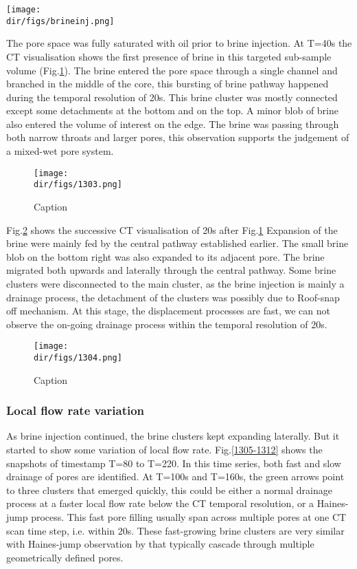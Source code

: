 \begin{sidewaysfigure}
    \centering
    \texttt{[image: \\dir/figs/brineinj.png]}
    \caption{Caption}
    \label{brineinj}
\end{sidewaysfigure}

The pore space was fully saturated with oil prior to brine injection. At T=40s the CT visualisation shows the first presence of brine in this targeted sub-sample volume (Fig.\ref{1303}). The brine entered the pore space through a single channel and branched in the middle of the core, this bursting of brine pathway happened during the temporal resolution of 20s. This brine cluster was mostly connected except some detachments at the bottom and on the top. A minor blob of brine also entered the volume of interest on the edge. The brine was passing through both narrow throats and larger pores, this observation supports the judgement of a mixed-wet pore system.

\begin{figure}
    \centering
    \texttt{[image: \\dir/figs/1303.png]}
    \caption{Caption}
    \label{1303}
\end{figure}

Fig.\ref{1304} shows the successive CT visualisation of 20s after Fig.\ref{1303} Expansion of the brine were mainly fed by the central pathway established earlier. The small brine blob on the bottom right was also expanded to its adjacent pore. The brine migrated both upwards and laterally through the central pathway. Some brine clusters were disconnected to the main cluster, as the brine injection is mainly a drainage process, the detachment of the clusters was possibly due to Roof-snap off mechanism. At this stage, the displacement processes are fast, we can not observe the on-going drainage process within the temporal resolution of 20s.

\begin{figure}
    \centering
    \texttt{[image: \\dir/figs/1304.png]}
    \caption{Caption}
    \label{1304}
\end{figure}

\subsubsection{Local flow rate variation}
As brine injection continued, the brine clusters kept expanding laterally. But it started to show some variation of local flow rate. Fig.\ref{1305-1312} shows the snapshots of timestamp T=80 to T=220. In this time series, both fast and slow drainage of pores are identified. At T=100s and T=160s, the green arrows point to three clusters that emerged quickly, this could be either a normal drainage process at a faster local flow rate below the CT temporal resolution, or a Haines-jump process. This fast pore filling usually span across multiple pores at one CT scan time step, i.e. within 20s. These fast-growing brine clusters are very similar with Haines-jump observation by \citet{berg2013real} that typically cascade through multiple geometrically defined pores.

